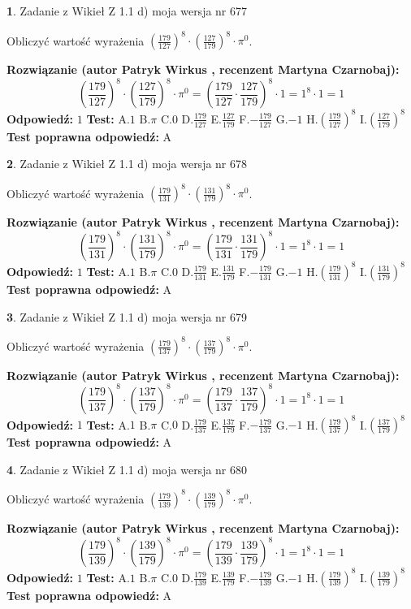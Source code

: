 \documentclass[12pt, a4paper]{article}
\theoremstyle{definition} %
\newtheorem{zad}{}
\newcommand{\zadStart}[1]{\begin{zad}#1\newline}
\newcommand{\zadStop}{\end{zad}}
\newcommand{\rozwStart}[2]{\noindent \textbf{Rozwiązanie (autor #1 , recenzent #2): }\newline}
\newcommand{\rozwStop}{\newline}
\newcommand{\odpStart}{\noindent \textbf{Odpowiedź:}\newline}
\newcommand{\odpStop}{\newline}
\newcommand{\testStart}{\noindent \textbf{Test:}\newline}
\newcommand{\testStop}{\newline}
\newcommand{\kluczStart}{\noindent \textbf{Test poprawna odpowiedź:}\newline}
\newcommand{\kluczStop}{\newline}
\begin{document}
\zadStart{Zadanie z Wikieł Z 1.1 d) moja wersja nr 677}

Obliczyć wartość wyrażenia $(\frac{179}{127})^{8} \cdot (\frac{127}{179})^{8} \cdot \pi^{0}$.
\zadStop
\rozwStart{Patryk Wirkus}{Martyna Czarnobaj}
$$(\frac{179}{127})^{8} \cdot (\frac{127}{179})^{8} \cdot \pi^{0} = (\frac{179}{127} \cdot \frac{127}{179})^{8} \cdot 1 = 1^{8} \cdot 1 = 1$$
\rozwStop
\odpStart
$1$
\odpStop
\testStart
A.$1$ B.$\pi$ C.$0$ D.$\frac{179}{127}$ E.$\frac{127}{179}$
F.$-\frac{179}{127}$ G.$-1$
H.$(\frac{179}{127})^{8}$
I.$(\frac{127}{179})^{8}$
\testStop
\kluczStart
A
\kluczStop



\zadStart{Zadanie z Wikieł Z 1.1 d) moja wersja nr 678}

Obliczyć wartość wyrażenia $(\frac{179}{131})^{8} \cdot (\frac{131}{179})^{8} \cdot \pi^{0}$.
\zadStop
\rozwStart{Patryk Wirkus}{Martyna Czarnobaj}
$$(\frac{179}{131})^{8} \cdot (\frac{131}{179})^{8} \cdot \pi^{0} = (\frac{179}{131} \cdot \frac{131}{179})^{8} \cdot 1 = 1^{8} \cdot 1 = 1$$
\rozwStop
\odpStart
$1$
\odpStop
\testStart
A.$1$ B.$\pi$ C.$0$ D.$\frac{179}{131}$ E.$\frac{131}{179}$
F.$-\frac{179}{131}$ G.$-1$
H.$(\frac{179}{131})^{8}$
I.$(\frac{131}{179})^{8}$
\testStop
\kluczStart
A
\kluczStop



\zadStart{Zadanie z Wikieł Z 1.1 d) moja wersja nr 679}

Obliczyć wartość wyrażenia $(\frac{179}{137})^{8} \cdot (\frac{137}{179})^{8} \cdot \pi^{0}$.
\zadStop
\rozwStart{Patryk Wirkus}{Martyna Czarnobaj}
$$(\frac{179}{137})^{8} \cdot (\frac{137}{179})^{8} \cdot \pi^{0} = (\frac{179}{137} \cdot \frac{137}{179})^{8} \cdot 1 = 1^{8} \cdot 1 = 1$$
\rozwStop
\odpStart
$1$
\odpStop
\testStart
A.$1$ B.$\pi$ C.$0$ D.$\frac{179}{137}$ E.$\frac{137}{179}$
F.$-\frac{179}{137}$ G.$-1$
H.$(\frac{179}{137})^{8}$
I.$(\frac{137}{179})^{8}$
\testStop
\kluczStart
A
\kluczStop



\zadStart{Zadanie z Wikieł Z 1.1 d) moja wersja nr 680}

Obliczyć wartość wyrażenia $(\frac{179}{139})^{8} \cdot (\frac{139}{179})^{8} \cdot \pi^{0}$.
\zadStop
\rozwStart{Patryk Wirkus}{Martyna Czarnobaj}
$$(\frac{179}{139})^{8} \cdot (\frac{139}{179})^{8} \cdot \pi^{0} = (\frac{179}{139} \cdot \frac{139}{179})^{8} \cdot 1 = 1^{8} \cdot 1 = 1$$
\rozwStop
\odpStart
$1$
\odpStop
\testStart
A.$1$ B.$\pi$ C.$0$ D.$\frac{179}{139}$ E.$\frac{139}{179}$
F.$-\frac{179}{139}$ G.$-1$
H.$(\frac{179}{139})^{8}$
I.$(\frac{139}{179})^{8}$
\testStop
\kluczStart
A
\kluczStop
\end{document}
